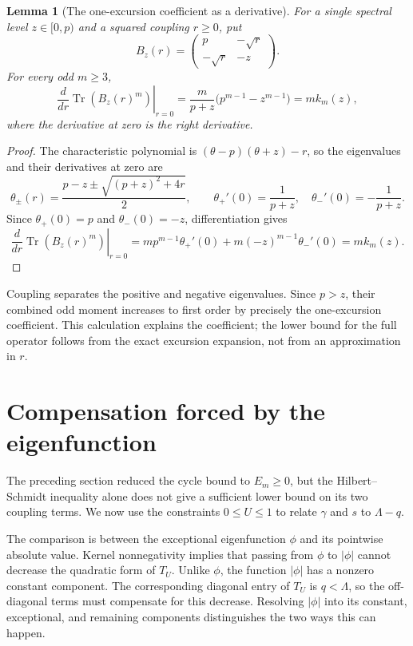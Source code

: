 \documentclass[11pt]{article}
\numberwithin{equation}{section}
\newtheorem{lemma}[theorem]{Lemma}
\newcommand{\Tr}{\operatorname{Tr}}
\begin{document}
\begin{lemma}[The one-excursion coefficient as a derivative]\label{lem:coupling-derivative}
For a single spectral level $z\in[0,p)$ and a squared coupling $r\ge0$,
put
\[
 B_z(r)=\begin{pmatrix}p&-\sqrt r\\-\sqrt r&-z\end{pmatrix}.
\]
For every odd $m\ge3$,
\[
 \left.\frac{d}{dr}\Tr(B_z(r)^m)\right|_{r=0}
   =\frac{m}{p+z}\bigl(p^{m-1}-z^{m-1}\bigr)=m k_m(z),
\]
where the derivative at zero is the right derivative.
\end{lemma}
\begin{proof}
The characteristic polynomial is $(\theta-p)(\theta+z)-r$,
so the eigenvalues and their derivatives at zero are
\[
 \theta_\pm(r)=\frac{p-z\pm\sqrt{(p+z)^2+4r}}2,
 \qquad \theta_+'(0)=\frac1{p+z},\quad
 \theta_-'(0)=-\frac1{p+z}.
\]
Since $\theta_+(0)=p$ and $\theta_-(0)=-z$, differentiation gives
\[
 \left.\frac{d}{dr}\Tr(B_z(r)^m)\right|_{r=0}
   =m p^{m-1}\theta_+'(0)+m(-z)^{m-1}\theta_-'(0)
   =m k_m(z).
\]
\end{proof}
Coupling separates the positive and negative eigenvalues. Since
$p>z$, their combined odd moment increases to first order by precisely
the one-excursion coefficient. This calculation explains the
coefficient; the lower bound for the full operator follows from the
exact excursion expansion, not from an approximation in $r$.

\section{Compensation forced by the eigenfunction}\label{sec:compensation}
The preceding section reduced the cycle bound to $E_m\ge0$, but
the Hilbert--Schmidt inequality alone does not give a sufficient
lower bound on its two coupling terms. We now use the constraints
$0\le U\le1$ to relate $\gamma$ and $s$ to $\Lambda-q$.

The comparison is between the exceptional eigenfunction $\phi$ and
its pointwise absolute value. Kernel nonnegativity implies that
passing from $\phi$ to $|\phi|$ cannot decrease the quadratic form
of $T_U$. Unlike $\phi$, the function $|\phi|$ has a nonzero
constant component. The corresponding diagonal entry of $T_U$ is
$q<\Lambda$, so the off-diagonal terms must compensate for this
decrease. Resolving $|\phi|$ into its constant, exceptional, and
remaining components distinguishes the two ways this can happen.
\end{document}
